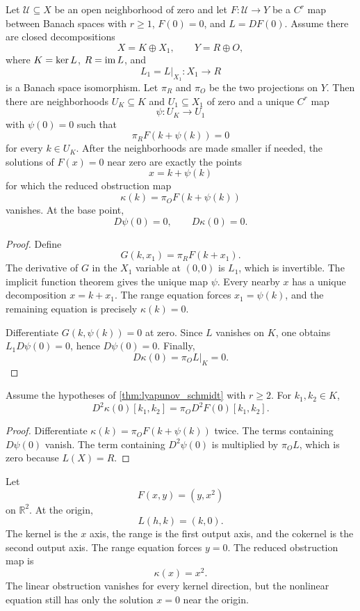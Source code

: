 \begin{theorem}\label{thm:lyapunov_schmidt}
Let $\mathcal U\subseteq X$ be an open neighborhood of zero and let $F:\mathcal U\to Y$ be a $C^r$ map between Banach spaces with $r\ge1$, $F(0)=0$, and $L=DF(0)$.  Assume there are closed decompositions
\[
X=K\oplus X_1,
\qquad
Y=R\oplus O,
\]
where $K=\operatorname{ker} L$, $R=\operatorname{im} L$, and
\[
L_1=L|_{X_1}:X_1\longrightarrow R
\]
is a Banach space isomorphism.  Let $\pi_R$ and $\pi_O$ be the two projections on $Y$.  Then there are neighborhoods $U_K\subseteq K$ and $U_1\subseteq X_1$ of zero and a unique $C^r$ map
\[
\psi:U_K\longrightarrow U_1
\]
with $\psi(0)=0$ such that
\[
\pi_RF(k+\psi(k))=0
\]
for every $k\in U_K$.  After the neighborhoods are made smaller if needed, the solutions of $F(x)=0$ near zero are exactly the points
\[
x=k+\psi(k)
\]
for which the reduced obstruction map
\[
\kappa(k)=\pi_OF(k+\psi(k))
\]
vanishes.  At the base point,
\[
D\psi(0)=0,
\qquad
D\kappa(0)=0.
\]
\end{theorem}

\begin{proof}
Define
\[
G(k,x_1)=\pi_RF(k+x_1).
\]
The derivative of $G$ in the $X_1$ variable at $(0,0)$ is $L_1$, which is invertible.  The implicit function theorem gives the unique map $\psi$.  Every nearby $x$ has a unique decomposition $x=k+x_1$.  The range equation forces $x_1=\psi(k)$, and the remaining equation is precisely $\kappa(k)=0$.

Differentiate $G(k,\psi(k))=0$ at zero.  Since $L$ vanishes on $K$, one obtains $L_1D\psi(0)=0$, hence $D\psi(0)=0$.  Finally,
\[
D\kappa(0)=\pi_OL|_K=0.
\]
\end{proof}


\begin{corollary}\label{cor:quadratic_reduced_obstruction}
Assume the hypotheses of \cref{thm:lyapunov_schmidt} with $r\ge2$.  For $k_1,k_2\in K$,
\[
D^2\kappa(0)[k_1,k_2]
=
\pi_O D^2F(0)[k_1,k_2].
\]
\end{corollary}

\begin{proof}
Differentiate $\kappa(k)=\pi_OF(k+\psi(k))$ twice.  The terms containing $D\psi(0)$ vanish.  The term containing $D^2\psi(0)$ is multiplied by $\pi_OL$, which is zero because $L(X)=R$.
\end{proof}

\begin{example}\label{ex:pure_quadratic_obstruction}
Let
\[
F(x,y)=(y,x^2)
\]
on $\mathbb R^2$.  At the origin,
\[
L(h,k)=(k,0).
\]
The kernel is the $x$ axis, the range is the first output axis, and the cokernel is the second output axis.  The range equation forces $y=0$.  The reduced obstruction map is
\[
\kappa(x)=x^2.
\]
The linear obstruction vanishes for every kernel direction, but the nonlinear equation still has only the solution $x=0$ near the origin.
\end{example}

